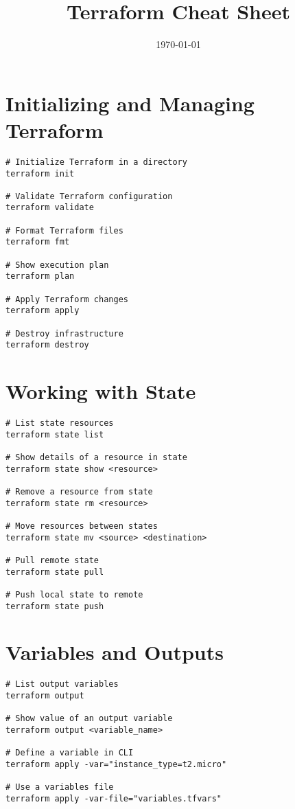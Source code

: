 \documentclass[11pt]{article}
\title{\textbf{Terraform Cheat Sheet}}
\author{}
\date{\today}
\begin{document}
    \maketitle

    \section*{Initializing and Managing Terraform}
    \begin{lstlisting}[style=terraformStyle]
# Initialize Terraform in a directory
terraform init

# Validate Terraform configuration
terraform validate

# Format Terraform files
terraform fmt

# Show execution plan
terraform plan

# Apply Terraform changes
terraform apply

# Destroy infrastructure
terraform destroy
    \end{lstlisting}

    \section*{Working with State}
    \begin{lstlisting}[style=terraformStyle]
# List state resources
terraform state list

# Show details of a resource in state
terraform state show <resource>

# Remove a resource from state
terraform state rm <resource>

# Move resources between states
terraform state mv <source> <destination>

# Pull remote state
terraform state pull

# Push local state to remote
terraform state push
    \end{lstlisting}

    \section*{Variables and Outputs}
    \begin{lstlisting}[style=terraformStyle]
# List output variables
terraform output

# Show value of an output variable
terraform output <variable_name>

# Define a variable in CLI
terraform apply -var="instance_type=t2.micro"

# Use a variables file
terraform apply -var-file="variables.tfvars"
    \end{lstlisting}
\end{document}
